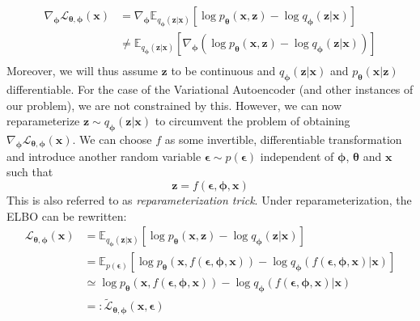 \documentclass[12pt]{report}
\theoremstyle{definition}
\begin{document}
\begin{equation}
\begin{split}
\nabla_{\pmb{\phi}}\mathcal{L}_{\pmb{\theta}, \pmb{\phi}}(\mathbf{x}) 
& = \nabla_{\pmb{\phi}} \mathbb{E}_{q_{\mathbf{\phi}}(\mathbf{z}|\mathbf{x})}\left[ \log p_{\mathbf{\theta}}(\mathbf{x}, \mathbf{z}) - \log q_{\mathbf{\phi}}(\mathbf{z}|\mathbf{x}) \right]	\\
& \neq \mathbb{E}_{q_{\mathbf{\phi}}(\mathbf{z}|\mathbf{x})}\left[ \nabla_{\pmb{\phi}} (\log p_{\mathbf{\theta}}(\mathbf{x}, \mathbf{z}) - \log q_{\pmb{\phi}}(\mathbf{z}|\mathbf{x})) \right] \\
\end{split}
\end{equation}
Moreover, we will thus assume $\mathbf{z}$ to be continuous and $q_{\mathbf{\phi}}(\mathbf{z}|\mathbf{x})$ and $p_{\mathbf{\theta}}(\mathbf{x}|\mathbf{z})$ differentiable. For the case of the Variational Autoencoder (and other instances of our problem), we are not constrained by this. However, we can now reparameterize $\mathbf{z} \sim q_{\mathbf{\phi}}(\mathbf{z}|\mathbf{x})$ to circumvent the problem of obtaining $\nabla_{\pmb{\phi}}\mathcal{L}_{\pmb{\theta}, \pmb{\phi}}(\mathbf{x})$. We can choose $f$ as some invertible, differentiable transformation and introduce another random variable $\pmb{\epsilon} \sim p(\pmb{\epsilon})$ independent of $\pmb{\phi}$, $\pmb{\theta}$ and $\mathbf{x}$ such that
\begin{equation}
\mathbf{z} = f(\pmb{\epsilon}, \pmb{\phi}, \mathbf{x})
\end{equation}
This is also referred to as \emph{reparameterization trick}. Under reparameterization, the ELBO can be rewritten:
\begin{equation}
\begin{split}
\mathcal{L}_{\pmb{\theta}, \pmb{\phi}}(\mathbf{x}) 
& = \mathbb{E}_{q_{\mathbf{\phi}}(\mathbf{z}|\mathbf{x})}\left[ \log p_{\mathbf{\theta}}(\mathbf{x}, \mathbf{z}) - \log q_{\mathbf{\phi}}(\mathbf{z}|\mathbf{x})\right]\\
& = \mathbb{E}_{p(\pmb{\epsilon})}\left[ \log p_{\mathbf{\theta}}(\mathbf{x}, f(\pmb{\epsilon}, \pmb{\phi}, \mathbf{x})) - \log q_{\mathbf{\phi}}(f(\pmb{\epsilon}, \pmb{\phi}, \mathbf{x})|\mathbf{x}) \right]	\\
& \simeq \log p_{\mathbf{\theta}}(\mathbf{x}, f(\pmb{\epsilon}, \pmb{\phi}, \mathbf{x})) - \log q_{\mathbf{\phi}}(f(\pmb{\epsilon}, \pmb{\phi}, \mathbf{x})|\mathbf{x})\\
& =: \tilde{\mathcal{L}}_{\pmb{\theta}, \pmb{\phi}}(\mathbf{x}, \pmb{\epsilon})\\
\end{split}
\end{equation}
\end{document}
